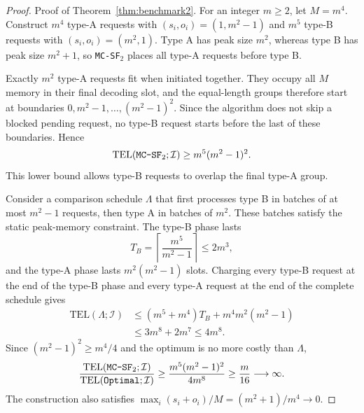 \documentclass[nonblindrev]{informs3_hide}
\newcommand{\mcsdff}{\texttt{MC-SF$_2$}}
\newcommand{\opt}{\texttt{Optimal}}
\begin{document}
\begin{proof}{Proof of Theorem~\ref{thm:benchmark2}.}
For an integer $m\ge2$, let $M=m^4$. Construct $m^4$ type-A requests
with $(s_i,o_i)=(1,m^2-1)$ and $m^5$ type-B requests with
$(s_i,o_i)=(m^2,1)$. Type A has peak size $m^2$, whereas type B has
peak size $m^2+1$, so \mcsdff{} places all type-A requests before type B.

Exactly $m^2$ type-A requests fit when initiated together. They occupy
all $M$ memory in their final decoding slot, and the equal-length groups
therefore start at boundaries $0,m^2-1,\ldots,(m^2-1)^2$. Since the
algorithm does not skip a blocked pending request, no type-B request starts
before the last of these boundaries. Hence
\[
    \mathrm{TEL}(\textup{\mcsdff};\mathcal I)
    \ge m^5(m^2-1)^2.
\]
This lower bound allows type-B requests to overlap the final type-A group.

Consider a comparison schedule $\Lambda$ that first processes type B in
batches of at most $m^2-1$ requests, then type A in batches of $m^2$.
These batches satisfy the static peak-memory constraint. The type-B phase
lasts
\[
    T_B=\left\lceil\frac{m^5}{m^2-1}\right\rceil\le2m^3,
\]
and the type-A phase lasts $m^2(m^2-1)$ slots. Charging every type-B
request at the end of the type-B phase and every type-A request at the end
of the complete schedule gives
\[
\begin{aligned}
    \mathrm{TEL}(\Lambda;\mathcal I)
    &\le(m^5+m^4)T_B+m^4m^2(m^2-1)\\
    &\le3m^8+2m^7\le4m^8.
\end{aligned}
\]
Since $(m^2-1)^2\ge m^4/4$ and the optimum is no more costly than
$\Lambda$,
\[
    \frac{\mathrm{TEL}(\textup{\mcsdff};\mathcal I)}
         {\mathrm{TEL}(\textup{\opt};\mathcal I)}
    \ge\frac{m^5(m^2-1)^2}{4m^8}
    \ge\frac{m}{16}\longrightarrow\infty.
\]
The construction also satisfies
$\max_i(s_i+o_i)/M=(m^2+1)/m^4\to0$.
\Halmos
\end{proof}
\end{document}

